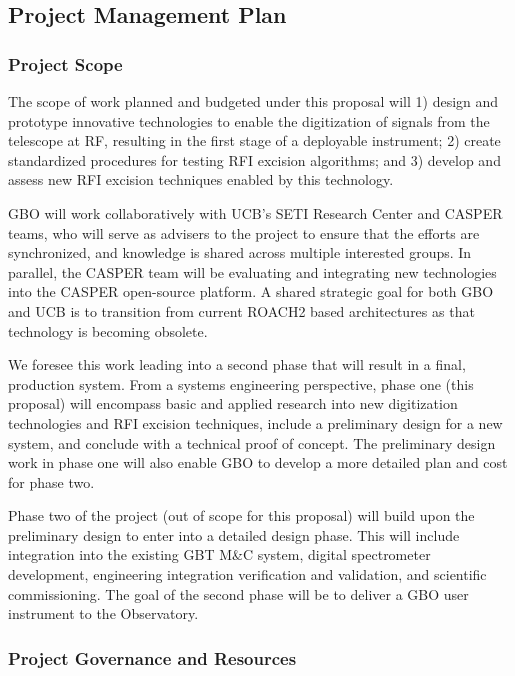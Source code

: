 \documentclass[10pt]{myNSF}
\begin{document}
\subsection{Project Management Plan}
\label{sec:management}

\subsubsection{Project Scope}
\label{sec:scope}

The scope of work planned and budgeted under this proposal will 1)
design and prototype innovative technologies to enable the
digitization of signals from the telescope at RF, resulting in the
first stage of a deployable instrument; 2) create standardized
procedures for testing RFI excision algorithms; and 3) develop and
assess new RFI excision techniques enabled by this technology.

GBO will work collaboratively with UCB's SETI Research Center
and CASPER teams, who will serve as advisers to the project to ensure
that the efforts are synchronized, and knowledge is shared across
multiple interested groups.  In parallel, the CASPER team will be
evaluating and integrating new technologies into the CASPER
open-source platform.  A shared strategic goal for both GBO and
UCB is to transition from current ROACH2 based architectures
as that technology is becoming obsolete.

We foresee this work leading into a second phase that will result in a
final, production system.  From a systems engineering perspective,
phase one (this proposal) will encompass basic and applied research
into new digitization technologies and RFI excision techniques,
include a preliminary design for a new system, and conclude with a
technical proof of concept. The preliminary design work in phase one
will also enable GBO to develop a more detailed plan and cost for
phase two.

Phase two of the project (out of scope for this proposal) will build
upon the preliminary design to enter into a detailed design phase.
This will include integration into the existing GBT M\&C system,
digital spectrometer development, engineering integration verification
and validation, and scientific commissioning.  The goal of the second
phase will be to deliver a GBO user instrument to the Observatory.

\subsubsection{Project Governance and Resources}
\label{sec:governance}
\end{document}
